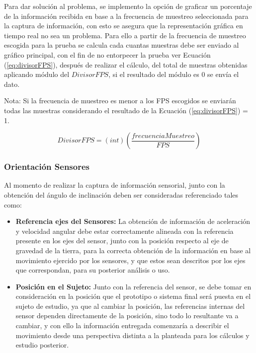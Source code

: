 \documentclass[12pt,a4paper]{article}
\begin{document}
Para dar solución al problema, se implemento la opción de graficar un porcentaje de la información recibida en base a la frecuencia de muestreo seleccionada para la captura de información, con esto se asegura que la representación gráfica en tiempo real no sea un problema. Para ello a partir de la frecuencia de muestreo escogida para la prueba se calcula cada cuantas muestras debe ser enviado al gráfico principal, con el fin de no entorpecer la prueba ver Ecuación (\ref{eq:divisorFPS}), después de realizar el cálculo, del total de muestras obtenidas aplicando módulo del $DivisorFPS$, si el resultado del módulo es 0 se envía el dato.

Nota: Si la frecuencia de muestreo es menor a los FPS escogidos se enviarán todas las muestras considerando el resultado de la Ecuación (\ref{eq:divisorFPS}) = 1.

\begin{equation}
	\label{eq:divisorFPS}
	DivisorFPS=(int)\left(\frac{frecuenciaMuestreo}{FPS}\right)
\end{equation}


\subsubsection{Orientación Sensores}
Al momento de realizar la captura de información sensorial, junto con la obtención del ángulo de inclinación deben ser consideradas referenciado tales como:
\begin{itemize}
	
	\item \textbf{Referencia ejes del Sensores:} La obtención de información de aceleración y velocidad angular debe estar correctamente alineada con la referencia presente en los ejes del sensor, junto con la posición respecto al eje de gravedad de la tierra, para la correcta obtención de la información en base al movimiento ejercido por los sensores, y que estos sean descritos por los ejes que correspondan, para su posterior análisis o uso.
	
	\item \textbf{Posición en el Sujeto:} Junto con la referencia del sensor, se debe tomar en consideración en la posición que el prototipo o sistema final será puesta en el sujeto de estudio, ya que al cambiar la posición, las referencias internas del sensor dependen directamente de la posición, sino todo lo resultante va a cambiar, y con ello la información entregada comenzaría a describir el movimiento desde una perspectiva distinta a la planteada para los cálculos y estudio posterior.
\end{itemize}
\end{document}
